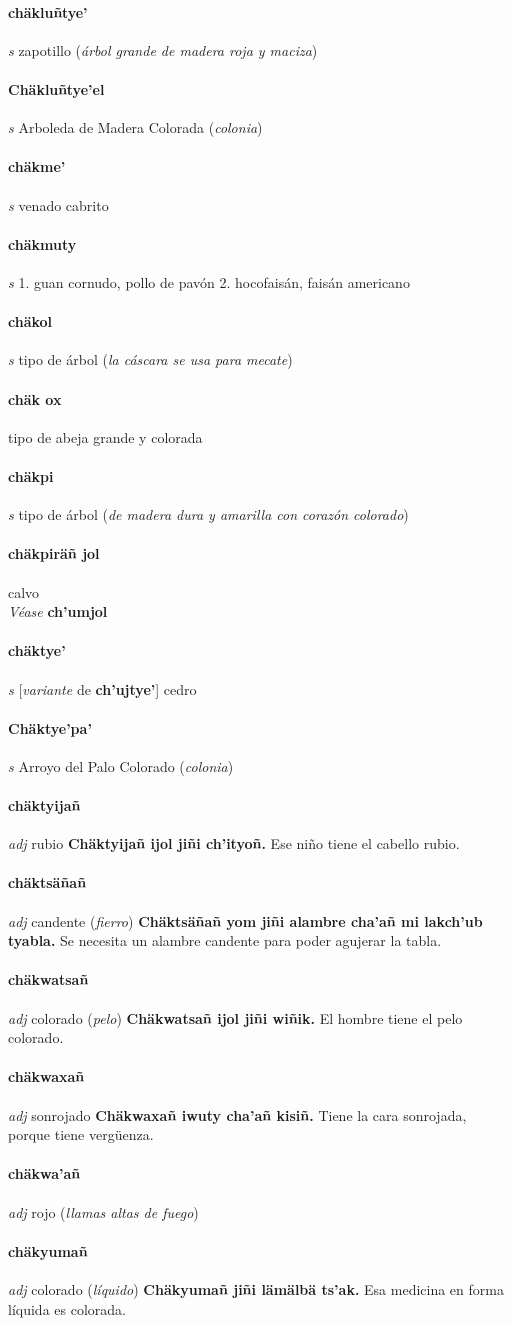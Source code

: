 \documentclass{scrbook}
\newcommand{\entry}[1]{\paragraph{#1}}
\newcommand{\onedefinition}[1]{#1.}
\newcommand{\partofspeech}[1]{\textit{#1}}
\newcommand{\spanishtranslation}[1]{#1}
\newcommand{\clarification}[1]{(\textit{#1})}
\newcommand{\cholexample}[1]{\textbf{#1}}
\newcommand{\exampletranslation}[1]{#1}
\newcommand{\alsosee}[1]{\\\textit{Véase} \textbf{#1}}
\newcommand{\conjugationtense}[1]{[\textit{#1}}
\newcommand{\conjugationverb}[1]{de \textbf{#1}]}
\begin{document}
\begin{multicols}{2}
\entry{chäkluñtye'}
\partofspeech{s}
\spanishtranslation{zapotillo}
\clarification{árbol grande de madera roja y maciza}

\entry{Chäkluñtye'el}
\partofspeech{s}
\spanishtranslation{Arboleda de Madera Colorada}
\clarification{colonia}

\entry{chäkme'}
\partofspeech{s}
\spanishtranslation{venado cabrito}

\entry{chäkmuty}
\partofspeech{s}
\onedefinition{1}
\spanishtranslation{guan cornudo, pollo de pavón}
\onedefinition{2}
\spanishtranslation{hocofaisán, faisán americano}

\entry{chäkol}
\partofspeech{s}
\spanishtranslation{tipo de árbol}
\clarification{la cáscara se usa para mecate}

\entry{chäk ox}
\spanishtranslation{tipo de abeja grande y colorada}

\entry{chäkpi}
\partofspeech{s}
\spanishtranslation{tipo de árbol}
\clarification{de madera dura y amarilla con corazón colorado}

\entry{chäkpiräñ jol}
\spanishtranslation{calvo}
\alsosee{ch'umjol}

\entry{chäktye'}
\partofspeech{s}
\conjugationtense{variante}
\conjugationverb{ch'ujtye'}
\spanishtranslation{cedro}

\entry{Chäktye'pa'}
\partofspeech{s}
\spanishtranslation{Arroyo del Palo Colorado}
\clarification{colonia}

\entry{chäktyijañ}
\partofspeech{adj}
\spanishtranslation{rubio}
\cholexample{Chäktyijañ ijol jiñi ch'ityoñ.}
\exampletranslation{Ese niño tiene el cabello rubio.}

\entry{chäktsäñañ}
\partofspeech{adj}
\spanishtranslation{candente}
\clarification{fierro}
\cholexample{Chäktsäñañ yom jiñi alambre cha'añ mi lakch'ub tyabla.}
\exampletranslation{Se necesita un alambre candente para poder agujerar la tabla.}

\entry{chäkwatsañ}
\partofspeech{adj}
\spanishtranslation{colorado}
\clarification{pelo}
\cholexample{Chäkwatsañ ijol jiñi wiñik.}
\exampletranslation{El hombre tiene el pelo colorado.}

\entry{chäkwaxañ}
\partofspeech{adj}
\spanishtranslation{sonrojado}
\cholexample{Chäkwaxañ iwuty cha'añ kisiñ.}
\exampletranslation{Tiene la cara sonrojada, porque tiene vergüenza.}

\entry{chäkwa'añ}
\partofspeech{adj}
\spanishtranslation{rojo}
\clarification{llamas altas de fuego}

\entry{chäkyumañ}
\partofspeech{adj}
\spanishtranslation{colorado}
\clarification{líquido}
\cholexample{Chäkyumañ jiñi lämälbä ts'ak.}
\exampletranslation{Esa medicina en forma líquida es colorada.}


\end{multicols}
\end{document}
